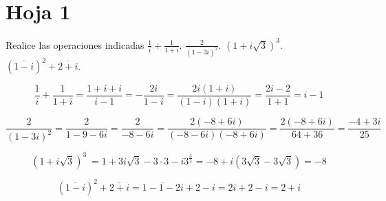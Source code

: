 
\section{Hoja 1}
%
\begin{problem}[1]
Realice las operaciones indicadas
\ppart $\displaystyle \frac{1}{i}+\frac{1}{1+i}$.
\ppart $\displaystyle \frac{2}{(1-3i)^2}$.
\ppart $\displaystyle (1+i\sqrt{3})^3$.
\ppart $\displaystyle (\overline{1-i})^2+\overline{2+i}$.

\solution

\spart
\[\frac{1}{i}+\frac{1}{1+i} = \frac{1+i+i}{i-1} = -\frac{2i}{1-i} = \frac{2i(1+i)}{(1-i)(1+i)} = \frac{2i-2}{1+1}=i-1\]

\spart
\[\frac{2}{(1-3i)^2} = \frac{2}{1-9-6i} = \frac{2}{-8-6i}=\frac{2(-8+6i)}{(-8-6i)(-8+6i)} = \frac{2(-8+6i)}{64+36} = \frac{-4+3i}{25}\]

\newpage
\spart
\[(1+i\sqrt{3})^3\ = 1 +3i\sqrt{3}-3\cdot 3-i3^{\frac{3}{2}} = -8 +i (3\sqrt{3}-3\sqrt{3}) = -8\]

\spart
\[(\overline{1-i})^2+\overline{2+i} = \overline{1-1-2i}+2-i = 2i+2-i=2+i\]
\end{problem}

